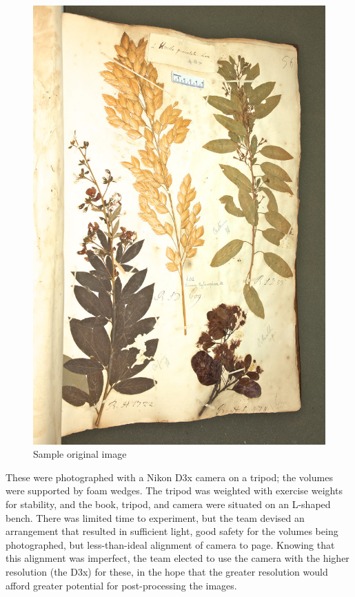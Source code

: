 \documentclass[a4paper]{llncs}
\begin{document}
\begin{figure}[!htbm]
  \centering

  \includegraphics[height=.50\textheight]{figures-downsampled/original.jpg}
  \caption{Sample original image}\label{fig:original}
\end{figure}

These were photographed with a Nikon D3x camera on a tripod; the volumes were supported by foam wedges. The tripod was weighted with exercise weights for stability, and the book, tripod, and camera were situated on an L-shaped bench. There was limited time to experiment, but the team devised an arrangement that resulted in sufficient light, good safety for the volumes being photographed, but less-than-ideal alignment of camera to page. Knowing that this alignment was imperfect, the team elected to use the camera with the higher resolution (the D3x) for these, in the hope that the greater resolution would afford greater potential for post-processing the images.
\end{document}
